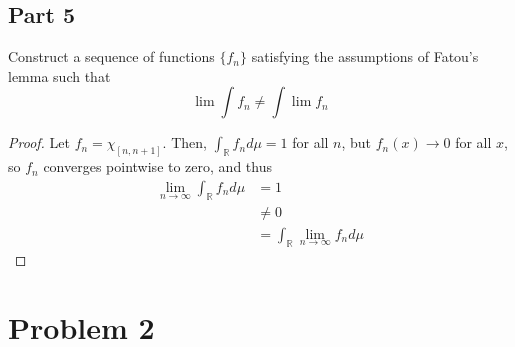 \documentclass[fontsize=11pt]{scrartcl} %
\numberwithin{equation}{section} %
\numberwithin{figure}{section} %
\numberwithin{table}{section} %
\newcommand{\R}{\mathbb{R}}
\begin{document}
\subsection*{Part 5}
Construct a sequence of functions $\{f_n\}$ satisfying the assumptions of Fatou's lemma such that
\[
\lim\int f_n \neq \int\lim f_n
\]

\begin{proof}
Let $f_n = \chi_{[n,n+1]}$. Then, $\int_{\R}f_nd\mu = 1$ for all $n$, but $f_n(x)\to 0$ for
all $x$, so $f_n$ converges pointwise to zero, and thus
\[
\begin{aligned}
\lim_{n\to\infty}\int_{\R}f_nd\mu   &= 1\\
                                    &\neq 0\\
                                    &=\int_{\R}\lim_{n\to\infty}f_nd\mu
\end{aligned}
\]
\end{proof}
\section*{Problem 2}





\end{document}
